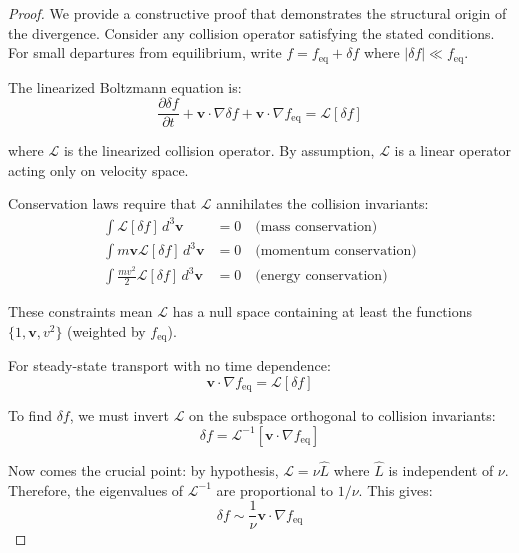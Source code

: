 \documentclass[12pt,a4paper]{article}
\newcommand{\vect}[1]{\mathbf{#1}}
\begin{document}
\begin{proof}
We provide a constructive proof that demonstrates the structural origin of the divergence. Consider any collision operator satisfying the stated conditions. For small departures from equilibrium, write $f = f_{\text{eq}} + \delta f$ where $|\delta f| \ll f_{\text{eq}}$.

The linearized Boltzmann equation is:
\begin{equation}
\frac{\partial \delta f}{\partial t} + \vect{v} \cdot \nabla \delta f + \vect{v} \cdot \nabla f_{\text{eq}} = \mathcal{L}[\delta f]
\label{eq:linearized_boltzmann}
\end{equation}

where $\mathcal{L}$ is the linearized collision operator. By assumption, $\mathcal{L}$ is a linear operator acting only on velocity space.

Conservation laws require that $\mathcal{L}$ annihilates the collision invariants:
\begin{align}
\int \mathcal{L}[\delta f] \, d^3\vect{v} &= 0 \quad \text{(mass conservation)}\label{eq:mass_conservation}\\
\int m\vect{v} \mathcal{L}[\delta f] \, d^3\vect{v} &= 0 \quad \text{(momentum conservation)}\label{eq:momentum_conservation}\\
\int \frac{m v^2}{2} \mathcal{L}[\delta f] \, d^3\vect{v} &= 0 \quad \text{(energy conservation)}\label{eq:energy_conservation}
\end{align}

These constraints mean $\mathcal{L}$ has a null space containing at least the functions $\{1, \vect{v}, v^2\}$ (weighted by $f_{\text{eq}}$).

For steady-state transport with no time dependence:
\begin{equation}
\vect{v} \cdot \nabla f_{\text{eq}} = \mathcal{L}[\delta f]
\label{eq:steady_state}
\end{equation}

To find $\delta f$, we must invert $\mathcal{L}$ on the subspace orthogonal to collision invariants:
\begin{equation}
\delta f = \mathcal{L}^{-1}[\vect{v} \cdot \nabla f_{\text{eq}}]
\label{eq:inversion}
\end{equation}

Now comes the crucial point: by hypothesis, $\mathcal{L} = \nu \hat{L}$ where $\hat{L}$ is independent of $\nu$. Therefore, the eigenvalues of $\mathcal{L}^{-1}$ are proportional to $1/\nu$. This gives:
\begin{equation}
\delta f \sim \frac{1}{\nu} \vect{v} \cdot \nabla f_{\text{eq}}
\label{eq:delta_f_scaling}
\end{equation}


\end{proof}
\end{document}
